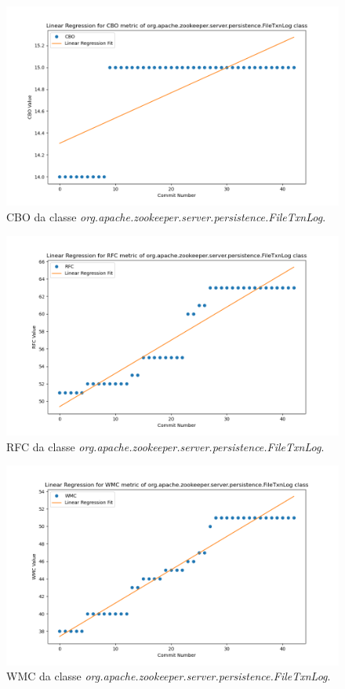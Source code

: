 \begin{figure}[h]
    \centering
    \includegraphics[width=0.8\linewidth]{figuras/343-83cf0a93c37759334fab885c2010fa0b7d953f52/Class-org.apache.zookeeper.server.persistence.FileTxnLog/CBO.png}
    \caption{CBO da classe \textit{org.apache.zookeeper.server.persistence.FileTxnLog}.}
    \label{fig:CBO3xPerformanceClass}
\end{figure}
\begin{figure}[h]
    \centering
    \includegraphics[width=0.8\linewidth]{figuras/343-83cf0a93c37759334fab885c2010fa0b7d953f52/Class-org.apache.zookeeper.server.persistence.FileTxnLog/RFC.png}
    \caption{RFC da classe \textit{org.apache.zookeeper.server.persistence.FileTxnLog}.}
    \label{fig:RFC3xPerformanceClass}
\end{figure}
\begin{figure}[h]
    \centering
    \includegraphics[width=0.8\linewidth]{figuras/343-83cf0a93c37759334fab885c2010fa0b7d953f52/Class-org.apache.zookeeper.server.persistence.FileTxnLog/WMC.png}
    \caption{WMC da classe \textit{org.apache.zookeeper.server.persistence.FileTxnLog}.}
    \label{fig:WMC3xPerformanceClass}
\end{figure}


